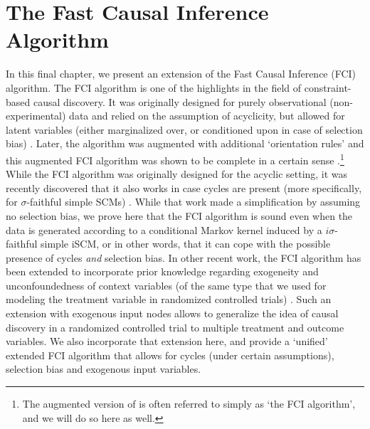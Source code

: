 \section{The Fast Causal Inference Algorithm}\label{sec:fci}
\newcommand\NewEFCI[1]{}

In this final chapter, we present an extension of the Fast Causal Inference (FCI) algorithm. 
The FCI algorithm is one of the highlights in the field of constraint-based causal discovery.
It was originally designed for purely observational (non-experimental) data and relied on the assumption of acyclicity, but allowed for latent variables (either marginalized over, or conditioned upon in case of selection bias) \cite{SMR1995,SMR1999}.
Later, the algorithm was augmented with additional `orientation rules' and this augmented FCI algorithm was shown to be complete in a certain sense \cite{Zhang2008_AI}.\footnote{The augmented version of \cite{Zhang2008_AI} is often referred to simply as `the FCI algorithm', and we will do so here as well.}
While the FCI algorithm was originally designed for the acyclic setting, it was recently discovered that it also works in case cycles are present (more specifically, for $\sigma$-faithful simple SCMs) \cite{MooijClaassen_UAI_20}.
While that work made a simplification by assuming no selection bias, we prove here that the FCI algorithm is sound even when the data is generated according to a conditional Markov kernel induced by a $i\sigma$-faithful simple iSCM, or in other words, that it can cope with the possible presence of cycles \emph{and} selection bias.
In other recent work, the FCI algorithm has been extended to incorporate prior knowledge regarding exogeneity and unconfoundedness of context variables (of the same type that we used for modeling the treatment variable in randomized controlled trials) \cite{Mooij++_JMLR_20}.
Such an extension with exogenous input nodes allows to generalize the idea of causal discovery in a randomized controlled trial to multiple treatment and outcome variables.
We also incorporate that extension here, and provide a `unified' extended FCI algorithm that allows for cycles (under certain assumptions), selection bias and exogenous input variables.


